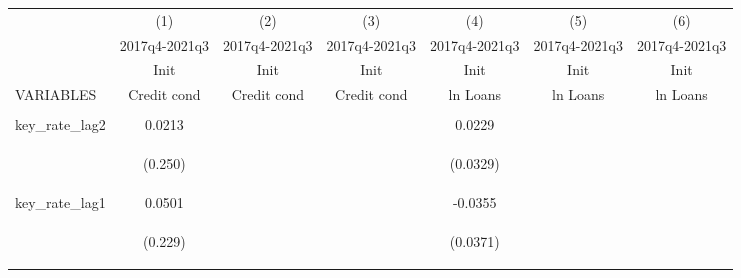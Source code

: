 \documentclass[]{article}
\begin{document}
\begin{center}
\begin{tabular}{lcccccc} \hline
 & (1) & (2) & (3) & (4) & (5) & (6) \\
 & 2017q4-2021q3 & 2017q4-2021q3 & 2017q4-2021q3 & 2017q4-2021q3 & 2017q4-2021q3 & 2017q4-2021q3 \\
 & Init & Init & Init & Init & Init & Init \\
VARIABLES & Credit cond & Credit cond & Credit cond & ln Loans & ln Loans & ln Loans \\ \hline
\vspace{4pt} & \begin{footnotesize}\end{footnotesize} & \begin{footnotesize}\end{footnotesize} & \begin{footnotesize}\end{footnotesize} & \begin{footnotesize}\end{footnotesize} & \begin{footnotesize}\end{footnotesize} & \begin{footnotesize}\end{footnotesize} \\
key\_rate\_lag2 & 0.0213 &  &  & 0.0229 &  &  \\
\vspace{4pt} & \begin{footnotesize}(0.250)\end{footnotesize} & \begin{footnotesize}\end{footnotesize} & \begin{footnotesize}\end{footnotesize} & \begin{footnotesize}(0.0329)\end{footnotesize} & \begin{footnotesize}\end{footnotesize} & \begin{footnotesize}\end{footnotesize} \\
key\_rate\_lag1 & 0.0501 &  &  & -0.0355 &  &  \\
\vspace{4pt} & \begin{footnotesize}(0.229)\end{footnotesize} & \begin{footnotesize}\end{footnotesize} & \begin{footnotesize}\end{footnotesize} & \begin{footnotesize}(0.0371)\end{footnotesize} & \begin{footnotesize}\end{footnotesize} & \begin{footnotesize}\end{footnotesize} \\

\end{tabular}
\end{center}
\end{document}
